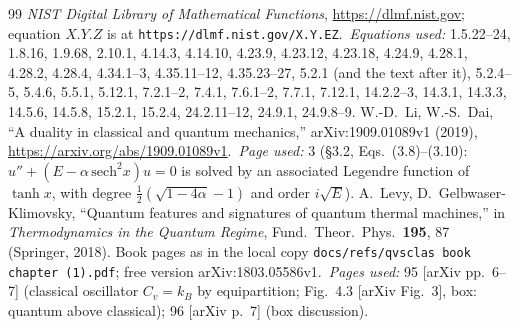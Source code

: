 \documentclass[11pt]{article}
\numberwithin{equation}{section}
\newcommand{\kB}{k_B}
\begin{document}
\begin{thebibliography}{99}
 \emph{NIST Digital Library of Mathematical Functions}, \url{https://dlmf.nist.gov}; equation $X.Y.Z$ is at \texttt{https://dlmf.nist.gov/X.Y.EZ}.\
\emph{Equations used:} 1.5.22--24, 1.8.16, 1.9.68, 2.10.1, 4.14.3, 4.14.10, 4.23.9, 4.23.12, 4.23.18, 4.24.9, 4.28.1, 4.28.2, 4.28.4, 4.34.1--3, 4.35.11--12, 4.35.23--27, 5.2.1 (and the text after it), 5.2.4--5, 5.4.6, 5.5.1, 5.12.1, 7.2.1--2, 7.4.1, 7.6.1--2, 7.7.1, 7.12.1, 14.2.2--3, 14.3.1, 14.3.3, 14.5.6, 14.5.8, 15.2.1, 15.2.4, 24.2.11--12, 24.9.1, 24.9.8--9.
\bibitem[LD]{LD} W.-D.~Li, W.-S.~Dai, ``A duality in classical and quantum mechanics,'' arXiv:1909.01089v1 (2019), \url{https://arxiv.org/abs/1909.01089v1}.\
\emph{Page used:} 3 (\S3.2, Eqs.~(3.8)--(3.10): $u''+(E-\alpha\,\mathrm{sech}^2x)u=0$ is solved by an associated Legendre function of $\tanh x$, with degree $\frac12(\sqrt{1-4\alpha}-1)$ and order $i\sqrt E$).
\bibitem[LGK]{LGK} A.~Levy, D.~Gelbwaser-Klimovsky, ``Quantum features and signatures of quantum thermal machines,'' in \emph{Thermodynamics in the Quantum Regime}, Fund.\ Theor.\ Phys.\ \textbf{195}, 87 (Springer, 2018). Book pages as in the local copy \texttt{docs/refs/qvsclas book chapter (1).pdf}; free version arXiv:1803.05586v1.\
\emph{Pages used:} 95 [arXiv pp.~6--7] (classical oscillator $C_v=\kB$ by equipartition; Fig.~4.3 [arXiv Fig.~3], box: quantum above classical); 96 [arXiv p.~7] (box discussion).
\end{thebibliography}
\end{document}
